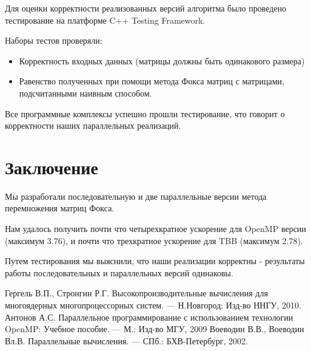 \documentclass{article}
\begin{document}
\par Для оценки корректности реализованных версий алгоритма было проведено тестирование на платформе C++ Testing Framework.
\par Наборы тестов проверяли:
\begin{itemize}
	\item Корректность входных данных (матрицы должны быть одинакового размера)
	\item Равенство полученных при помощи метода Фокса матриц с матрицами, подсчитанными наивным способом. 
\end{itemize}

\par Все программные комплексы успешно прошли тестирование, что говорит о корректности наших параллельных реализаций.
\newpage

\section*{Заключение}
\par Мы разработали последовательную и две параллельные версии метода перемножения матриц Фокса.
\par Нам удалось получить почти что четырехкратное ускорение для OpenMP версии (максимум 3.76), 
и почти что трехкратное ускорение для TBB (максимум 2.78). 
\par 
Путем тестирования мы выяснили, что наши реализации корректны - результаты
работы последовательных и параллельных версий одинаковы.
\newpage

\begin{thebibliography}{1}
 Гергель В.П., Стронгин Р.Г. Высокопроизводительные вычисления для многоядерных многопроцессорных систем. 
— Н.Новгород: Изд-во ННГУ, 2010.
 Антонов А.С. Параллельное программирование с использованием технологии
OpenMP: Учебное пособие. — М.: Изд-во МГУ, 2009
 Воеводин В.В., Воеводин Вл.В. Параллельные вычисления. — СПб.: БХВ-Петербург, 2002. 
\end{thebibliography}
\newpage

\end{document}
